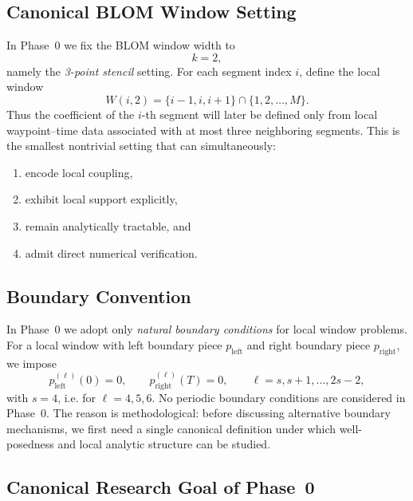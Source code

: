 \subsection{Canonical BLOM Window Setting}
\label{subsec:phase0_canonical_window}

In Phase~0 we fix the BLOM window width to
\[
k=2,
\]
namely the \emph{3-point stencil} setting.
For each segment index $i$, define the local window
\begin{equation}
\label{eq:phase0_window}
W(i,2)
=
\{i-1,i,i+1\}\cap \{1,2,\dots,M\}.
\end{equation}
Thus the coefficient of the $i$-th segment will later be defined only from local waypoint--time data associated with at most three neighboring segments.
This is the smallest nontrivial setting that can simultaneously:
\begin{enumerate}
  \item encode local coupling,
  \item exhibit local support explicitly,
  \item remain analytically tractable, and
  \item admit direct numerical verification.
\end{enumerate}

\subsection{Boundary Convention}
\label{subsec:phase0_boundary}

In Phase~0 we adopt only \emph{natural boundary conditions} for local window problems.
For a local window with left boundary piece $p_{\mathrm{left}}$ and right boundary piece $p_{\mathrm{right}}$, we impose
\begin{equation}
\label{eq:phase0_natural_bc}
 p_{\mathrm{left}}^{(\ell)}(0)=0,
 \qquad
 p_{\mathrm{right}}^{(\ell)}(T)=0,
 \qquad \ell=s,s+1,\dots,2s-2,
\end{equation}
with $s=4$, i.e. for $\ell=4,5,6$.
No periodic boundary conditions are considered in Phase~0.
The reason is methodological: before discussing alternative boundary mechanisms, we first need a single canonical definition under which well-posedness and local analytic structure can be studied.

\subsection{Canonical Research Goal of Phase~0}
\label{subsec:phase0_goal}

